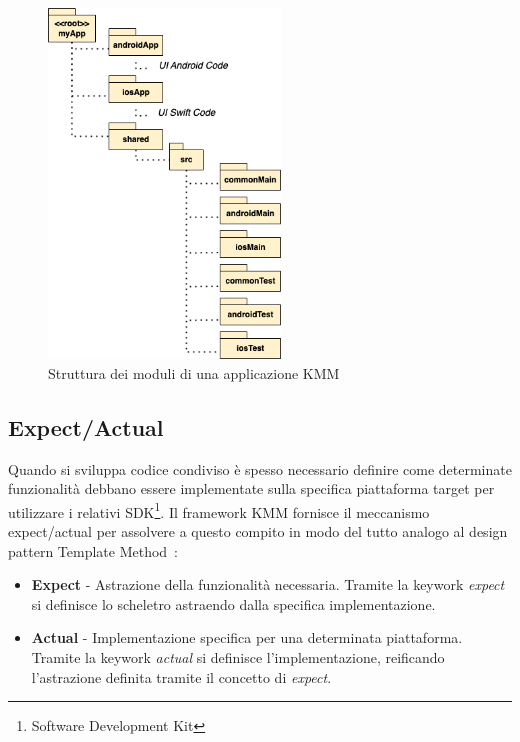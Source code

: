 \begin{figure}[H]
    \centering
    \includegraphics[width=0.55\textwidth]{img/struttura_app_kmm.png}
    \caption{Struttura dei moduli di una applicazione KMM}
\end{figure}

\subsection{Expect/Actual}
Quando si sviluppa codice condiviso è spesso necessario definire come determinate funzionalità debbano essere implementate sulla specifica piattaforma target per utilizzare i relativi SDK\footnote{Software Development Kit}. 
Il framework KMM fornisce il meccanismo expect/actual per assolvere a questo compito in modo del tutto analogo al design pattern Template Method~\cite{gamma1994design}:

\begin{itemize}
    \item \textbf{Expect} - Astrazione della funzionalità necessaria. Tramite la keywork \textit{expect} si definisce lo scheletro astraendo dalla specifica implementazione.
    
    \item \textbf{Actual} - Implementazione specifica per una determinata piattaforma. Tramite la keywork \textit{actual} si definisce l'implementazione, reificando l'astrazione definita tramite il concetto di \textit{expect}.
\end{itemize}

